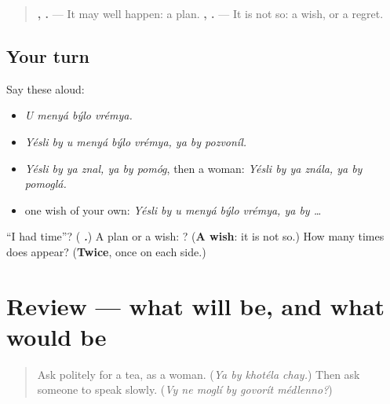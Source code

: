 \begin{culture}
\begin{quote}
\textbf{  ,  .} — It may well happen: a plan. \textbf{   ,   .} — It is not so: a wish, or a regret.
\end{quote}
\end{culture}

\subsection*{Your turn}
Say these aloud:

\begin{itemize}
\raggedright
  \item \emph{U menyá býlo vrémya.}
  \item \emph{Yésli by u menyá býlo vrémya, ya by pozvoníl.}
  \item \emph{Yésli by ya znal, ya by pomóg}, then a woman: \emph{Yésli by ya znála, ya by pomoglá.}
  \item one wish of your own: \emph{Yésli by u menyá býlo vrémya, ya by …}
\end{itemize}

\begin{tcolorbox}[breakable,colback=teal!4,colframe=teal!35!black,title={Before you move on}]
\textquotedblleft{}I had time\textquotedblright{}? (\emph{\textbf{   .}}) A plan or a wish: \emph{   }? (\textbf{A wish}: it is not so.) How many times does \emph{} appear? (\textbf{Twice}, once on each side.)
\end{tcolorbox}
\section[(review)]{Review — what will be, and what would be}

\label{lesson:RU-C270-review}



\begin{quote}
Ask politely for a tea, as a woman. (\emph{Ya by khotéla chay.}) Then ask someone to speak slowly. (\emph{Vy ne moglí by govorít médlenno?})
\end{quote}

